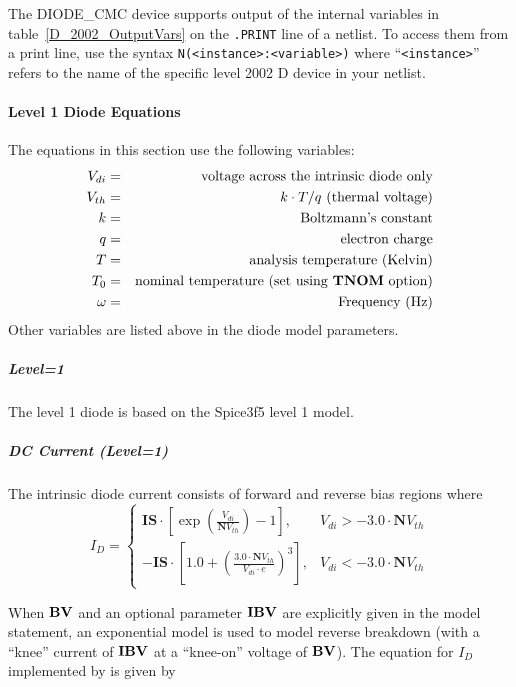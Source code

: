 The DIODE\_CMC device supports output of the internal variables in
table~\ref{D_2002_OutputVars} on the \texttt{.PRINT} line of a netlist.
To access them from a print line, use the syntax
\texttt{N(<instance>:<variable>)} where ``\texttt{<instance>}'' refers to the
name of the specific level 2002 D device in your netlist.





\paragraph{Level 1 Diode Equations}

The equations in this section use the following variables:
\begin{eqnarray*}
V_{di} & = & \mbox{voltage across the intrinsic diode only} \\
V_{th} & = & \mbox{$k \cdot T/q$ (thermal voltage)}         \\
k      & = & \mbox{Boltzmann's constant}                    \\
q      & = & \mbox{electron charge}                         \\
T      & = & \mbox{analysis temperature (Kelvin)}           \\
T_{0}  & = & \mbox{nominal temperature (set using \textrm{\textbf{TNOM}}
option)} \\
\omega & = & \mbox{Frequency (Hz)}
\end{eqnarray*}
Other variables are listed above in the diode model parameters.

\subparagraph{Level=1}
The level 1 diode is based on the Spice3f5 level 1 model.

\subparagraph{DC Current (Level=1)}

The intrinsic diode current consists of forward and reverse bias regions where
$$
I_D = \left\{ \begin{array}{ll}
\mathbf{IS}\cdot\left[\exp \left(\frac{V_{di}}{\mathbf{N}V_{th}}\right) - 1
\right], & V_{di} > -3.0\cdot\mathbf{N}V_{th} \\
-\mathbf{IS}\cdot\left[1.0 + \left(\frac{3.0\cdot\mathbf{N}V_{th}}{V_{di}\cdot
e}\right)^3\right], & V_{di} < -3.0\cdot\mathbf{N}V_{th}
\end{array}
\right.
$$


When $\mathbf{BV}$ and an optional parameter $\mathbf{IBV}$ are explicitly given in the model
statement, an exponential model is used to model reverse breakdown (with a
``knee'' current of $\mathbf{IBV}$ at a ``knee-on'' voltage of $\mathbf{BV}$).  The equation
for $I_D$ implemented by \Xyce{} is given by

